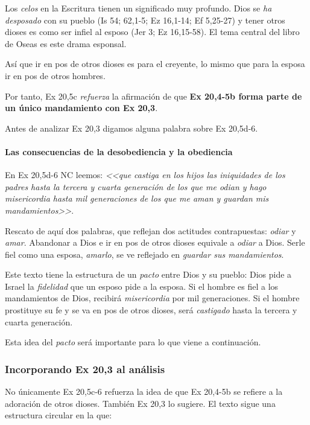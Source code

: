 \documentclass{article}
\begin{document}
Los \emph{celos} en la Escritura tienen un significado muy profundo. Dios se \emph{ha desposado} con su pueblo (Is 54; 62,1-5; Ez 16,1-14; Ef 5,25-27) y tener otros dioses es como ser infiel al esposo (Jer 3; Ez 16,15-58). El tema central del libro de Oseas es este drama esponsal.

As\'{i} que ir en pos de otros dioses es para el creyente, lo mismo que para la esposa ir en pos de otros hombres.%

Por tanto, Ex 20,5c \emph{refuerza} la afirmaci\'on de que \textbf{Ex 20,4-5b forma parte de un \'unico mandamiento con Ex 20,3}.

Antes de analizar Ex 20,3 digamos alguna palabra sobre Ex 20,5d-6.

\paragraph{Las consecuencias de la desobediencia y la obediencia}

En Ex 20,5d-6 NC leemos: \emph{<<que castiga en los hijos las iniquidades de los padres hasta la tercera y cuarta generaci\'on de los que me odian y hago misericordia hasta mil generaciones de los que me aman y guardan mis mandamientos>>}.

Rescato de aqu\'{i} dos palabras, que reflejan dos actitudes contrapuestas: \emph{odiar} y \emph{amar}. Abandonar a Dios e ir en pos de otros dioses equivale a \emph{odiar} a Dios. Serle fiel como una esposa, \emph{amarlo}, se ve reflejado en \emph{guardar sus mandamientos}.

Este texto tiene la estructura de un \emph{pacto} entre Dios y su pueblo: Dios pide a Israel la \emph{fidelidad} que un esposo pide a la esposa. Si el hombre es fiel a los mandamientos de Dios, recibir\'a \emph{misericordia} por mil generaciones. Si el hombre prostituye su fe y se va en pos de otros dioses, ser\'a \emph{castigado} hasta la tercera y cuarta generaci\'on.

Esta idea del \emph{pacto} ser\'a importante para lo que viene a continuaci\'on.

\subsubsection{Incorporando Ex 20,3 al an\'alisis}

No \'unicamente Ex 20,5c-6 refuerza la idea de que Ex 20,4-5b se refiere a la adoraci\'on de otros dioses. Tambi\'en Ex 20,3 lo sugiere. El texto sigue una estructura circular en la que:
\end{document}
